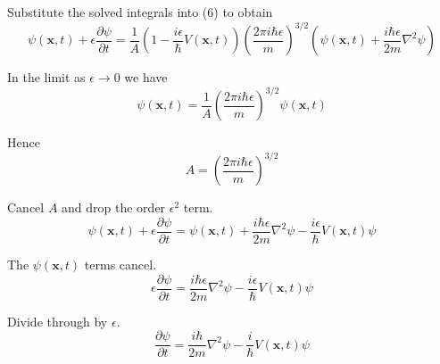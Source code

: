 \documentclass[12pt]{article}
\begin{document}
Substitute the solved integrals into (6) to obtain
\begin{equation*}
\psi(\mathbf{x},t)+\epsilon\frac{\partial\psi}{\partial t}
=\frac{1}{A}
\left(1-\frac{i\epsilon}{\hbar}V\left(\mathbf x,t\right)\right)
\left(\frac{2\pi i\hbar\epsilon}{m}\right)^{3/2}
\left(
\psi(\mathbf x,t)+\frac{i\hbar\epsilon}{2m}\nabla^2\psi
\right)
\end{equation*}

In the limit as $\epsilon\rightarrow0$ we have
\begin{equation*}
\psi(\mathbf{x},t)=\frac{1}{A}\left(\frac{2\pi i\hbar\epsilon}{m}\right)^{3/2}\psi(\mathbf x,t)
\end{equation*}

Hence
\begin{equation*}
A=\left(\frac{2\pi i\hbar\epsilon}{m}\right)^{3/2}
\end{equation*}

Cancel $A$ and drop the order $\epsilon^2$ term.
\begin{equation*}
\psi(\mathbf{x},t)+\epsilon\frac{\partial\psi}{\partial t}
=\psi(\mathbf{x},t)
+\frac{i\hbar\epsilon}{2m}\nabla^2\psi
-\frac{i\epsilon}{\hbar}V(\mathbf x,t)\psi
\end{equation*}

The $\psi(\mathbf x,t)$ terms cancel.
\begin{equation*}
\epsilon\frac{\partial\psi}{\partial t}
=\frac{i\hbar\epsilon}{2m}\nabla^2\psi
-\frac{i\epsilon}{\hbar}V(\mathbf x,t)\psi
\end{equation*}

Divide through by $\epsilon$.
\begin{equation*}
\frac{\partial\psi}{\partial t}
=\frac{i\hbar}{2m}\nabla^2\psi
-\frac{i}{\hbar}V(\mathbf x,t)\psi
\tag{16}
\end{equation*}
\end{document}

